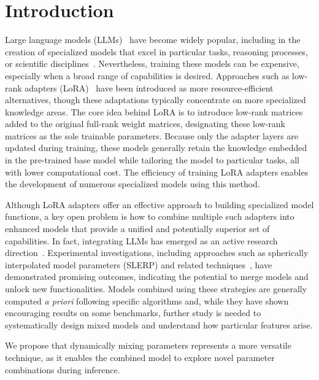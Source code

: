 \section{Introduction}  
Large language models (LLMs)~\cite{Vaswani2017AttentionNeedc,Touvron2023LlamaModels,OpenAI2023GPT-4Report,Chowdhery2022PaLM:Pathways,Jiang2023Mistral7B,Gunasekar2023TextbooksNeed} have become widely popular, including in the creation of specialized models that excel in particular tasks, reasoning processes, or scientific disciplines~\cite{Bubeck2023SparksGPT-4,Buehler2023MechGPTModalities,Nejjar2023LLMsAnalysis,Buehler2023GenerativeDesign,Luu2023BioinspiredLLM:Materials,Luu2023GenerativeSolvents,Buehler2023MeLMProblemsb,Ge2023OpenAGI:Experts}. Nevertheless, training these models can be expensive, especially when a broad range of capabilities is desired. Approaches such as low-rank adapters (LoRA)~\cite{hu2021lora} have been introduced as more resource-efficient alternatives, though these adaptations typically concentrate on more specialized knowledge areas. The core idea behind LoRA is to introduce low-rank matrices added to the original full-rank weight matrices, designating these low-rank matrices as the sole trainable parameters. Because only the adapter layers are updated during training, these models generally retain the knowledge embedded in the pre-trained base model while tailoring the model to particular tasks, all with lower computational cost. The efficiency of training LoRA adapters enables the development of numerous specialized models using this method.

Although LoRA adapters offer an effective approach to building specialized model functions, a key open problem is how to combine multiple such adapters into enhanced models that provide a unified and potentially superior set of capabilities. In fact, integrating LLMs has emerged as an active research direction~\cite{Kim2023SOLARUp-Scaling}. Experimental investigations, including approaches such as spherically interpolated model parameters (SLERP) and related techniques~\cite{Arcee-ai/mergekit:Models.}, have demonstrated promising outcomes, indicating the potential to merge models and unlock new functionalities. Models combined using these strategies are generally computed {\it a priori} following specific algorithms and, while they have shown encouraging results on some benchmarks, further study is needed to systematically design mixed models and understand how particular features arise.

We propose that dynamically mixing parameters represents a more versatile technique, as it enables the combined model to explore novel parameter combinations during inference.

